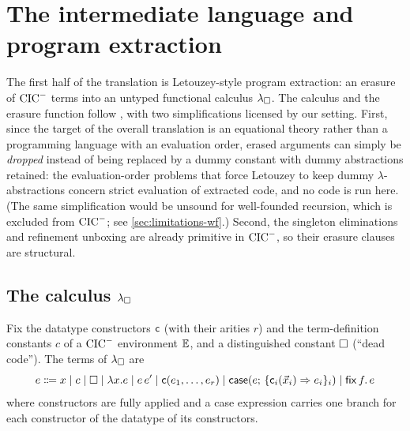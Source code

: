 \section{The intermediate language and program extraction}
\label{sec:lambdabox}

The first half of the translation is Letouzey-style program extraction:
an erasure of $\mathrm{CIC}^{-}$ terms into an untyped functional calculus $\lambda_{\square}$.
The calculus and the erasure function follow
\cite[Ch.~2]{Letouzey2004}, with two simplifications licensed by our
setting.  First, since the target of the overall translation is an
equational theory rather than a programming language with an evaluation
order, erased arguments can simply be \emph{dropped} instead of being
replaced by a dummy constant with dummy abstractions retained: the
evaluation-order problems that force Letouzey to keep dummy
$\lambda$-abstractions \cite[\S 2.1]{Letouzey2004} concern strict
evaluation of extracted code, and no code is run here.  (The same
simplification would be unsound for well-founded recursion, which is
excluded from $\mathrm{CIC}^{-}$; see \cref{sec:limitations-wf}.)  Second, the
singleton eliminations and refinement unboxing are already primitive in
$\mathrm{CIC}^{-}$, so their erasure clauses are structural.

\subsection{The calculus \texorpdfstring{$\lambda_{\square}$}{lambda-box}}

\begin{definition}
\label{def:lbox-syntax}
Fix the datatype constructors $\mathsf{c}$ (with their arities $r$) and the
term-definition constants $c$ of a $\mathrm{CIC}^{-}$ environment $\mathbb{E}$, and a
distinguished constant $\square$ (``dead code'').  The terms of $\lambda_{\square}$ are
\[
  e \Coloneqq x \mid c \mid \square \mid \lambda x.e \mid e\,e'
    \mid \mathsf{c}(e_1, \dots, e_r)
    \mid \mathsf{case}(e;\, \{\mathsf{c}_i(\vec{x}_i) \Rightarrow e_i\}_i)
    \mid \mathsf{fix}\,f.\,e
\]
where constructors are fully applied and a case expression carries one
branch for each constructor of the datatype of its constructors.
\end{definition}

